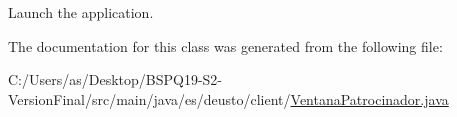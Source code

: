 Launch the application. 

The documentation for this class was generated from the following file\+:\begin{DoxyCompactItemize}
\item 
C\+:/\+Users/as/\+Desktop/\+B\+S\+P\+Q19-\/\+S2-\/\+Version\+Final/src/main/java/es/deusto/client/\mbox{\hyperlink{_ventana_patrocinador_8java}{Ventana\+Patrocinador.\+java}}\end{DoxyCompactItemize}
